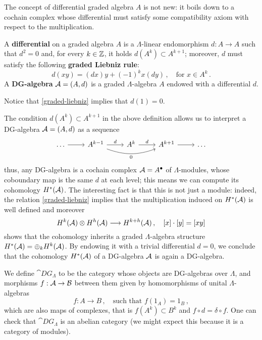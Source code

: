 	The concept of differential graded algebra $A$ is not new:
	it boils down to a cochain complex whose differential
	must satisfy some compatibility axiom with respect to the multiplication.
	
	\begin{df}
		A \textbf{differential} on a graded algebra $A$ is a
		$\Lambda$-linear endomorphism $d:A \to A$
		such that $d^{2} = 0$ and, for every $k \in {\mathbb Z}$,
		it holds $d(A^{k}) \subset A^{k+1}$;
		moreover, $d$ must satisfy the following \textbf{graded Liebniz rule}:
		\begin{equation}\label{graded-liebniz}
		 	d(xy) = (dx)y + (-1)^{k}x (dy)\,,
		 	\quad \text{for } x \in A^{k}\,.
		 \end{equation} 
		A \textbf{DG-algebra} $\mathcal{A} = (A,d)$
		is a graded $\Lambda$-algebra $A$ endowed with a differential $d$.
	\end{df}
	
	\begin{rmk}
		Notice that \eqref{graded-liebniz} implies that $d(1)=0$.
	\end{rmk}	
	
	The condition $d(A^{k}) \subset A^{k+1}$ in the above definition
	allows us to interpret a DG-algebra $\mathcal{A} = (A,d)$ as a
	sequence
	\begin{equation*}
		\begin{tikzcd}
			\dots \ar[r] & A^{k-1} \ar[r, "d"] \ar[rr, bend right=20, "0"']
			& A^{k} \ar[r, "d"] 
			& A^{k+1} \ar[r] & \dots
		\end{tikzcd}
	\end{equation*}
	thus, any DG-algebra is a cochain complex $\mathcal{A} = A^{\bullet}$
	of $\Lambda$-modules,
	whose coboundary map is the same $d$ at each level;
	this means we can compute its cohomology
	$H^{*}(\mathcal{A})$. The interesting fact is that 
	this is not just a module:
	indeed, the relation \eqref{graded-liebniz} implies that
	the multiplication induced on $H^{*}(\mathcal{A})$ 
	is well defined and moreover
	\begin{equation*}
		H^{k}(\mathcal{A}) \otimes H^{h}(\mathcal{A}) \longrightarrow H^{k+h}(\mathcal{A})\,,
		\quad [x] \cdot [y] = [xy]
	\end{equation*}
	shows that the cohomology inherits a graded $\Lambda$-algebra 
	structure $H^{*}(\mathcal{A}) = \oplus_{k} H^{k}(\mathcal{A})$.
	By endowing it with a trivial differential $d=0$,
	we conclude that the cohomology $H^{*}(\mathcal{A})$ of a DG-algebra $\mathcal{A}$
	is again a DG-algebra.
	
	
	We define $\cat{DG}_{\Lambda}$ to be the category whose objects
	are DG-algebras over $\Lambda$, 
	and morphisms $f:\mathcal{A} \to \mathcal{B}$ between them
	given by homomorphisms of unital $\Lambda$-algebras
	\begin{equation*}
		f : A \longrightarrow B\,, \quad 
		\text{such that } f\left(1_{A}\right) = 1_{B}\,,
	\end{equation*}
	which are also maps of complexes, that is 
	$f(A^{k}) \subset B^{k}$ and $f \circ d = \delta \circ f$.
	One can check that $\cat{DG}_{\Lambda}$ is an abelian category
	(we might expect this because it is a category of modules).
	
